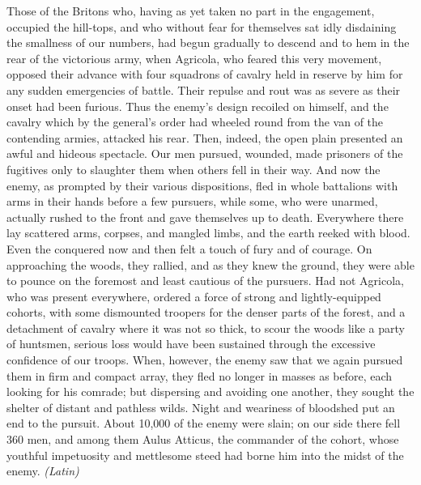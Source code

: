 
Those of the Britons who, having as yet taken no part in the engagement, occupied the hill-tops, and who without fear for themselves sat idly disdaining the smallness of our numbers, had begun gradually to descend and to hem in the rear of the victorious army, when Agricola, who feared this very movement, opposed their advance with four squadrons of cavalry held in reserve by him for any sudden emergencies of battle. Their repulse and rout was as severe as their onset had been furious. Thus the enemy's design recoiled on himself, and the cavalry which by the general's order had wheeled round from the van of the contending armies, attacked his rear. Then, indeed, the open plain presented an awful and hideous spectacle. Our men pursued, wounded, made prisoners of the fugitives only to slaughter them when others fell in their way. And now the enemy, as prompted by their various dispositions, fled in whole battalions with arms in their hands before a few pursuers, while some, who were unarmed, actually rushed to the front and gave themselves up to death. Everywhere there lay scattered arms, corpses, and mangled limbs, and the earth reeked with blood. Even the conquered now and then felt a touch of fury and of courage. On approaching the woods, they rallied, and as they knew the ground, they were able to pounce on the foremost and least cautious of the pursuers. Had not Agricola, who was present everywhere, ordered a force of strong and lightly-equipped cohorts, with some dismounted troopers for the denser parts of the forest, and a detachment of cavalry where it was not so thick, to scour the woods like a party of huntsmen, serious loss would have been sustained through the excessive confidence of our troops. When, however, the enemy saw that we again pursued them in firm and compact array, they fled no longer in masses as before, each looking for his comrade; but dispersing and avoiding one another, they sought the shelter of distant and pathless wilds. Night and weariness of bloodshed put an end to the pursuit. About 10,000 of the enemy were slain; on our side there fell 360 men, and among them Aulus Atticus, the commander of the cohort, whose youthful impetuosity and mettlesome steed had borne him into the midst of the enemy. \emph{(Latin)}


